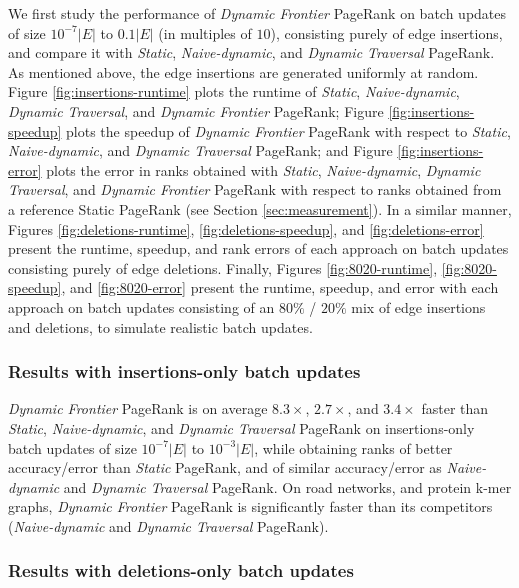 We first study the performance of \textit{Dynamic Frontier} PageRank on batch updates of size $10^{-7}|E|$ to $0.1|E|$ (in multiples of $10$), consisting purely of edge insertions, and compare it with \textit{Static}, \textit{Naive-dynamic}, and \textit{Dynamic Traversal} PageRank. As mentioned above, the edge insertions are generated uniformly at random. Figure \ref{fig:insertions-runtime} plots the runtime of \textit{Static}, \textit{Naive-dynamic}, \textit{Dynamic Traversal}, and \textit{Dynamic Frontier} PageRank; Figure \ref{fig:insertions-speedup} plots the speedup of \textit{Dynamic Frontier} PageRank with respect to \textit{Static}, \textit{Naive-dynamic}, and \textit{Dynamic Traversal} PageRank; and Figure \ref{fig:insertions-error} plots the error in ranks obtained with \textit{Static}, \textit{Naive-dynamic}, \textit{Dynamic Traversal}, and \textit{Dynamic Frontier} PageRank with respect to ranks obtained from a reference Static PageRank (see Section \ref{sec:measurement}). In a similar manner, Figures \ref{fig:deletions-runtime}, \ref{fig:deletions-speedup}, and \ref{fig:deletions-error} present the runtime, speedup, and rank errors of each approach on batch updates consisting purely of edge deletions. Finally, Figures \ref{fig:8020-runtime}, \ref{fig:8020-speedup}, and \ref{fig:8020-error} present the runtime, speedup, and error with each approach on batch updates consisting of an $80\%$ / $20\%$ mix of edge insertions and deletions, to simulate realistic batch updates.


\subsubsection{Results with insertions-only batch updates}

\textit{Dynamic Frontier} PageRank is on average $8.3\times$, $2.7\times$, and $3.4\times$ faster than \textit{Static}, \textit{Naive-dynamic}, and \textit{Dynamic Traversal} PageRank on insertions-only batch updates of size $10^{-7}|E|$ to $10^{-3}|E|$, while obtaining ranks of better accuracy/error than \textit{Static} PageRank, and of similar accuracy/error as \textit{Naive-dynamic} and \textit{Dynamic Traversal} PageRank. On road networks, and protein k-mer graphs, \textit{Dynamic Frontier} PageRank is significantly faster than its competitors (\textit{Naive-dynamic} and \textit{Dynamic Traversal} PageRank).


\subsubsection{Results with deletions-only batch updates}

